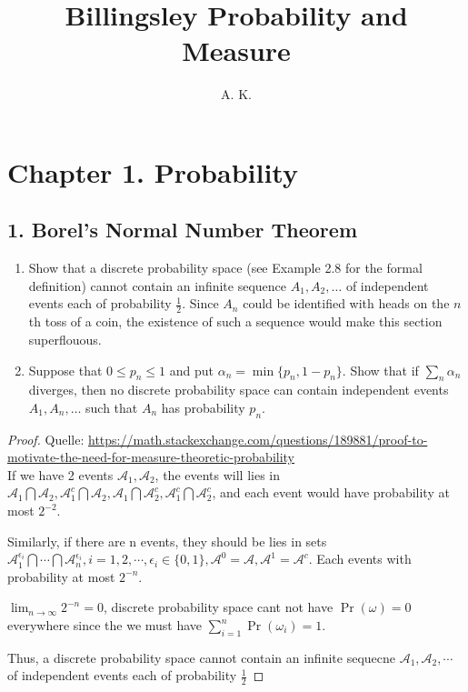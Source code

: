 \documentclass[11pt]{article}
\newenvironment{exercise}[2][Exercise]{\begin{trivlist}
\item[\hskip \labelsep {\bfseries #1}\hskip \labelsep {\bfseries #2.}]}{\end{trivlist}}
\begin{document}
\title{Billingsley Probability and Measure}%
\author{A. K.} %

\maketitle

\section*{Chapter 1. Probability}
\subsection*{1. Borel's Normal Number Theorem}
\begin{exercise}{1.1}
    \begin{enumerate}
        \item Show that a discrete probability space (see Example 2.8 for the formal definition) cannot contain an infinite sequence $A_1, A_2, \ldots$ of independent events each of probability $\frac{1}{2}$. Since $A_n$ could be identified with heads on the $n$th toss of a coin, the existence of such a sequence would make this section superflouous.
        \item Suppose that $0 \leq p_n \leq 1$ and put $\alpha_n = \min \{ p_n, 1 - p_n \}$. Show that if $\sum_n \alpha_n$ diverges, then no discrete probability space can contain independent events $A_1, A_n, \ldots$ such that $A_n$ has probability $p_n$.
    \end{enumerate}
\end{exercise}
\begin{proof}
Quelle: \url{https://math.stackexchange.com/questions/189881/proof-to-motivate-the-need-for-measure-theoretic-probability}\\

If we have 2 events $\mathcal{A}_1, \mathcal{A}_2$, the events will lies in $\mathcal{A}_1 \bigcap \mathcal{A}_2, \mathcal{A}_1^c \bigcap \mathcal{A}_2, \mathcal{A}_1 \bigcap \mathcal{A}_2^c, \mathcal{A}_1^c \bigcap \mathcal{A}_2^c$, and each event would have probability at most $2^{-2}$.

Similarly, if there are n events, they should be lies in sets $\mathcal{A}_1^{\epsilon_i} \bigcap \cdots\bigcap \mathcal{A}_n^{\epsilon_i}, i = 1,2,\cdots, \epsilon_i \in \{0,1\}, \mathcal{A}^0 = \mathcal{A}, \mathcal{A}^1 = \mathcal{A}^c$. Each events with probability at most $2^{-n}$.

$\lim_{n \to \infty} 2^{-n} = 0$, discrete probability space cant not have $\Pr(\omega) = 0$ everywhere since the we must have $\sum_{i=1}^n \Pr(\omega_i) =1$.

Thus, a discrete probability space cannot contain an infinite sequecne $\mathcal{A}_1, \mathcal{A}_2,\cdots$ of independent events each of probability $\frac{1}{2}$
\end{proof}
\end{document}
